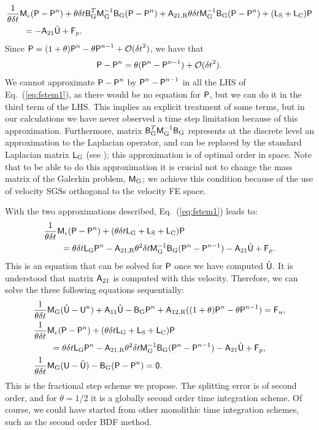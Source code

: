 \documentclass[11pt,a4paper,oneside,reqno]{amsart}
\newcommand{\Eq}[1]{(\ref{eq:#1})}
\def\cl{\nonumber\\}
\def\el{{\nonumber}}
\def\dt{{\delta t}}
\def\mA{\hbox{{\sffamily A}}}
\def\mB{\hbox{{\sffamily B}}}
\def\mL{\hbox{{\sffamily L}}}
\def\mM{\hbox{{\sffamily M}}}
\def\mU{\hbox{{\sffamily U}}}
\def\mP{\hbox{{\sffamily P}}}
\def\mF{\hbox{{\sffamily F}}}
\def\mzero{\hbox{{\sffamily 0}}}
\begin{document}
\begin{align}
& \frac{1}{\theta\dt} \mM_{\epsilon} ({\mP} - \mP^n) +
\theta\dt \mB_{\rm G}^T \mM^{-1}_{\rm G}  \mB_{\rm G} (\mP - \mP^n )
+ \mA_{21,{\rm R}} \theta\dt  \mM^{-1}_{\rm G}  \mB_{\rm G} (\mP - \mP^n ) + (\mL_{\rm S} +  \mL_{\rm C})\mP \cl
& \qquad = -\mA_{21}\hat{\mU}
+ \mF_p.
\label{eq:fstem1}
\end{align}
Since $\mP = (1+\theta)\mP^n -  \theta\mP^{n-1} + \mathcal{O}(\dt^2)$, we have that  
\begin{align}
\mP - \mP^n  =\theta( \mP^n - \mP^{n-1}) + \mathcal{O}(\dt^2).\el
\end{align}
We cannot approximate $\mP - \mP^n$ by $ \mP^n - \mP^{n-1}$ in all the LHS of Eq.~\Eq{fstem1}, as there would be no equation for $\mP$, but we can do it in the third term of the LHS. This implies an explicit treatment of some terms, but in our calculations we have never observed a time step limitation because of this approximation. Furthermore, matrix  $\mB_{\rm G}^T \mM^{-1}_{\rm G}  \mB_{\rm G}$ represents at the discrete level an approximation to the Laplacian operator, and can be replaced by the standard Laplacian matrix $\mL_{\rm G}$ (see \cite{codina11}); this approximation is of optimal order in space. Note that to be able to do this approximation it is crucial not to change the mass matrix of the Galerkin problem, $\mM_{\rm G}$; we achieve this condition because of the use of velocity SGSs orthogonal to the velocity FE space.

With the two approximations described, Eq.~\Eq{fstem1} leads to:
\begin{align}
& \frac{1}{\theta\dt} \mM_{\epsilon} ({\mP} - \mP^n) +
( \theta\dt \mL_{\rm G} + \mL_{\rm S}+ \mL_{\rm C})  \mP \cl
& \qquad =  \theta\dt \mL_{\rm G}   \mP^n
- \mA_{21,{\rm R}} \theta^2 \dt  \mM^{-1}_{\rm G}  \mB_{\rm G} (\mP^n - \mP^{n-1} ) -\mA_{21}\hat{\mU} + \mF_p.\el
\end{align}
This is an equation that can be solved for $\mP$ once we have computed $\hat{\mU}$. It is understood that matrix $\mA_{21}$ is computed with this velocity. Therefore, we can solve the three following equations sequentially:
\begin{align}
& \frac{1}{\theta\dt} \mM_{\rm G} (\hat{\mU} - \mU^n) + \mA_{11}{\hat{\mU}} 
- \mB_{\rm G} \mP^n + \mA_{12,{\rm R}} ((1+\theta)\mP^n -\theta\mP^{n-1})  = \mF_u, \label{eq:fs4a}\\
&   \frac{1}{\theta\dt} \mM_{\epsilon} ({\mP} - \mP^n) +
(\theta\dt \mL_{\rm G} + \mL_{\rm S} +  \mL_{\rm C})  \mP \cl
& \qquad =  \theta\dt \mL_{\rm G}   \mP^n
- \mA_{21,{\rm R}} \theta^2 \dt  \mM^{-1}_{\rm G}  \mB_{\rm G} (\mP^n - \mP^{n-1} ) -\mA_{21}\hat{\mU} + \mF_p, 
\label{eq:fs4b}\\
&  \frac{1}{\theta\dt} \mM_{\rm G} (\mU - \hat{\mU} ) 
-  \mB_{\rm G} (\mP - \mP^n)  = \mzero. \label{eq:fs4c}
\end{align}
This is the fractional step scheme we propose. The splitting error is of second order, and for $\theta = 1/2$ it is a globally second order time integration scheme. Of course, we could have started from other monolithic time integration schemes, such as the second order BDF method. 
\end{document}
